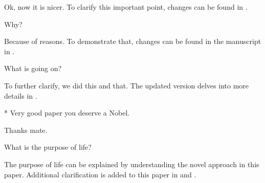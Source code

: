 \documentclass[journal]{IEEEtran}
\begin{document}
\begin{responseletter}
\begin{revcomment}
  \begin{revresponse}
    Ok, now it is nicer.
    \lipsum[1]
    To clarify this important point, changes can be found in .
  \end{revresponse}
\end{revcomment}




\begin{revcomment}
  Why? \lipsum[1]

  \begin{revresponse}
    Because of reasons. \lipsum[1] To demonstrate that, changes can be found in the manuscript in .
  \end{revresponse}
\end{revcomment}

\bigbreak{}
\bigbreak{}

\begin{revcomment}
  What is going on? \lipsum[1]

  \begin{revresponse}
    To further clarify, we did this and that.
    \lipsum[1]
    The updated version delves into more details in .
  \end{revresponse}
\end{revcomment}




\begin{revcomment}*
  Very good paper you deserve a Nobel. \lipsum[1]

  \begin{revresponse}
    Thanks mate. \lipsum[1]
  \end{revresponse}
\end{revcomment}

\begin{revcomment}
  What is the purpose of life? \lipsum[1]

  \begin{revresponse}
    The purpose of life can be explained by understanding the novel approach in this paper.
    \lipsum[1]
    Additional clarification is added to this paper in  and .


\end{revresponse}
\end{revcomment}
\end{responseletter}
\end{document}
